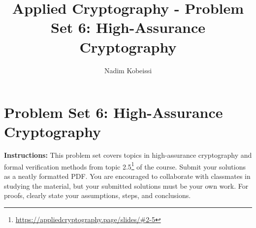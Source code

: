 \documentclass[10pt,a4paper,american]{exam}
\title{Applied Cryptography - Problem Set 6: High-Assurance Cryptography}
\author{Nadim Kobeissi}
\begin{document}
\classhandoutheader
\section*{Problem Set 6: High-Assurance Cryptography}

\begin{tcolorbox}[colframe=OliveGreen!30!white,colback=OliveGreen!5!white]
	\textbf{Instructions:} This problem set covers topics in high-assurance cryptography and formal verification methods from topic 2.5\footnote{\url{https://appliedcryptography.page/slides/\#2-5}} of the course. Submit your solutions as a neatly formatted PDF. You are encouraged to collaborate with classmates in studying the material, but your submitted solutions must be your own work. For proofs, clearly state your assumptions, steps, and conclusions.
\end{tcolorbox}
\end{document}

